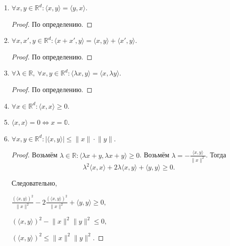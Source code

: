 \documentclass[12pt,a4paper]{report}
\begin{document}
\begin{enumerate}
    \item $\forall x,y\in\mathbb{R}^d\colon \langle x,y\rangle=\langle y,x\rangle$.
    \begin{proof}
        По определению.
    \end{proof}

    \item $\forall x,x',y\in\mathbb{R}^d\colon \langle x+x',y\rangle=\langle x,y\rangle+\langle x',y\rangle$.
    \begin{proof}
        По определению.
    \end{proof}

    \item $\forall \lambda\in\mathbb{R},\ \forall x,y\in\mathbb{R}^d\colon \langle\lambda x,y\rangle=\langle x,\lambda y\rangle$.
    \begin{proof}
        По определению.
    \end{proof}

    \item $\forall x\in\mathbb{R}^d\colon \langle x,x\rangle\geq 0$.


    \item $\langle x,x\rangle=0\iff x=\mathbb{0}$.

    \item $\forall x,y\in\mathbb{R}^d\colon |\langle x,y\rangle|\leq\lVert x\rVert\cdot\lVert y\rVert$.
    \begin{proof}
        Возьмём $\lambda\in\mathbb{R}\colon \langle\lambda x+y,\lambda x+y\rangle\geq 0$. Возьмём
        $\displaystyle \lambda=-\frac{\langle x,y\rangle}{\lVert x\rVert^2}$. Тогда
        \[
        \displaystyle \lambda^2\langle x,x\rangle +2\lambda\langle x,y\rangle +\langle y,y\rangle\geq 0.
        \]

        Следовательно,

        \noindent
        $\displaystyle
            \frac{(\langle x,y\rangle)^2}{\lVert x\rVert^2}
            -2\frac{(\langle x,y\rangle)^2}{\lVert x\rVert^2}
            +\langle y,y\rangle\geq 0,$

        \noindent
            $\displaystyle
            (\langle x,y\rangle)^2
            -\lVert x\rVert^2\lVert y\rVert^2\leq 0,
            $

        \noindent
            $\displaystyle
            (\langle x,y\rangle)^2
            \leq
            \lVert x\rVert^2\lVert y\rVert^2.
            $
    \end{proof}
\end{enumerate}
\end{document}
